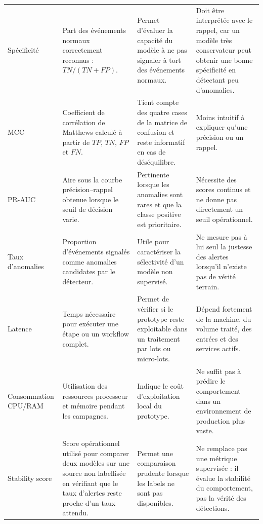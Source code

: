 \begin{longtable}{p{2.7cm}p{4.1cm}p{3.6cm}p{3.6cm}}
Spécificité &
Part des événements normaux correctement reconnus : $TN/(TN+FP)$. &
Permet d'évaluer la capacité du modèle à ne pas signaler à tort des événements normaux. &
Doit être interprétée avec le rappel, car un modèle très conservateur peut obtenir une bonne spécificité en détectant peu d'anomalies. \\

MCC &
Coefficient de corrélation de Matthews calculé à partir de $TP$, $TN$, $FP$ et $FN$. &
Tient compte des quatre cases de la matrice de confusion et reste informatif en cas de déséquilibre. &
Moins intuitif à expliquer qu'une précision ou un rappel. \\

PR-AUC &
Aire sous la courbe précision--rappel obtenue lorsque le seuil de décision varie. &
Pertinente lorsque les anomalies sont rares et que la classe positive est prioritaire. &
Nécessite des scores continus et ne donne pas directement un seuil opérationnel. \\

Taux d'anomalies &
Proportion d'événements signalés comme anomalies candidates par le détecteur. &
Utile pour caractériser la sélectivité d'un modèle non supervisé. &
Ne mesure pas à lui seul la justesse des alertes lorsqu'il n'existe pas de vérité terrain. \\

Latence &
Temps nécessaire pour exécuter une étape ou un workflow complet. &
Permet de vérifier si le prototype reste exploitable dans un traitement par lots ou micro-lots. &
Dépend fortement de la machine, du volume traité, des entrées et des services actifs. \\

Consommation CPU/RAM &
Utilisation des ressources processeur et mémoire pendant les campagnes. &
Indique le coût d'exploitation local du prototype. &
Ne suffit pas à prédire le comportement dans un environnement de production plus vaste. \\

Stability score &
Score opérationnel utilisé pour comparer deux modèles sur une source non labellisée en vérifiant que le taux d'alertes reste proche d'un taux attendu. &
Permet une comparaison prudente lorsque les labels ne sont pas disponibles. &
Ne remplace pas une métrique supervisée : il évalue la stabilité du comportement, pas la vérité des détections. \\

\bottomrule

\end{longtable}


